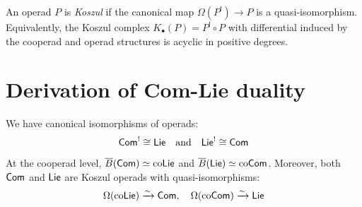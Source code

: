 \begin{definition}\label{def:koszul-operad}
An operad $P$ is \emph{Koszul} if the canonical map $\Omega(P^!) \to P$ is a quasi-isomorphism. Equivalently, the Koszul complex $K_\bullet(P) = P^! \circ P$ with differential induced by the cooperad and operad structures is acyclic in positive degrees.
\end{definition}
 
\section{Derivation of Com-Lie duality}
 
\begin{theorem}\label{thm:com-lie}
We have canonical isomorphisms of operads:
\[
\mathsf{Com}^! \cong \mathsf{Lie} \quad \text{and} \quad \mathsf{Lie}^! \cong \mathsf{Com}
\]
At the cooperad level, $\overline{B}(\mathsf{Com}) \simeq \mathrm{co}\mathsf{Lie}$ and $\overline{B}(\mathsf{Lie}) \simeq \mathrm{co}\mathsf{Com}$.
Moreover, both $\mathsf{Com}$ and $\mathsf{Lie}$ are Koszul operads with quasi-isomorphisms:
\[
\Omega(\text{co}\mathsf{Lie}) \xrightarrow{\sim} \mathsf{Com}, \quad \Omega(\text{co}\mathsf{Com}) \xrightarrow{\sim} \mathsf{Lie}
\]
\end{theorem}
 
